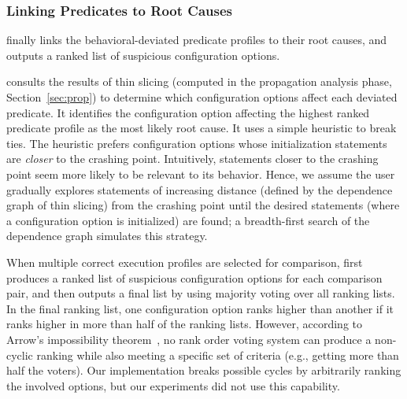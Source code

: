 

\subsubsection{Linking Predicates to Root Causes}
\label{sec:linking}


\ourtool finally links the behavioral-deviated
predicate profiles to their root causes, and outputs a ranked list of suspicious
configuration options.

\ourtool consults the results of thin slicing (computed in the propagation
analysis phase, Section~\ref{sec:prop}) to determine which
configuration options affect each deviated predicate.
It identifies the configuration option
affecting the highest ranked predicate profile as the most likely
root cause.  It uses a simple heuristic to break ties.
The heuristic prefers configuration options whose initialization
statements are \textit{closer} to the
crashing point. Intuitively, statements closer to the
crashing point seem more likely to be relevant to its behavior.
Hence, we assume the user gradually explores statements of
increasing distance (defined by the dependence graph of thin slicing)
from the crashing point until the desired statements (where a configuration
option is initialized) are found; a breadth-first
search of the dependence graph simulates this strategy.


When multiple correct execution profiles are selected for comparison,
\ourtool first produces a ranked list of suspicious
configuration options for each comparison pair, and then outputs
a final list by using majority voting over all ranking lists.
In the final ranking list, one configuration option ranks higher
than another if it ranks higher in more than half of the ranking lists.
However, according to Arrow's impossibility theorem~\cite{Fishburn1970103},
no rank order voting system can produce a non-cyclic ranking while also
meeting a specific set of criteria (e.g., getting more than half the voters).
Our implementation breaks possible cycles by arbitrarily ranking the
involved options, but our experiments did not use this capability.



